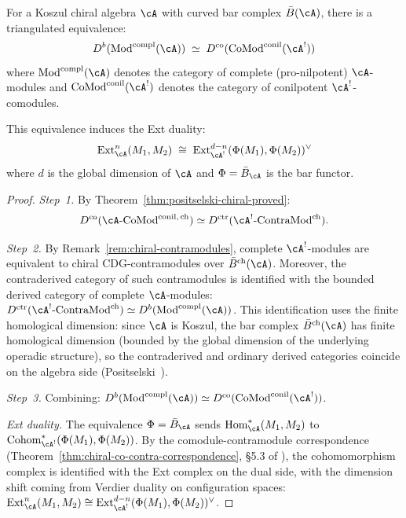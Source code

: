 \begin{theorem}
\label{thm:full-derived-module-equiv-proved}
For a Koszul chiral algebra $\cA$ with curved bar complex
$\bar{B}(\cA)$, there is a triangulated equivalence:
\begin{equation}\label{eq:full-derived-equiv-proved}
D^b(\mathrm{Mod}^{\mathrm{compl}}(\cA))
\;\simeq\;
D^{\mathrm{co}}(\mathrm{CoMod}^{\mathrm{conil}}(\cA^!))
\end{equation}
where $\mathrm{Mod}^{\mathrm{compl}}(\cA)$ denotes the category
of complete \textup{(}pro-nilpotent\textup{)} $\cA$-modules
and $\mathrm{CoMod}^{\mathrm{conil}}(\cA^!)$ denotes the
category of conilpotent $\cA^!$-comodules.

This equivalence induces the Ext duality:
\begin{equation}\label{eq:ext-duality-proved}
\mathrm{Ext}^n_{\cA}(M_1, M_2)
\;\cong\;
\mathrm{Ext}^{d-n}_{\cA^!}(\Phi(M_1), \Phi(M_2))^{\vee}
\end{equation}
where $d$ is the global dimension of $\cA$ and
$\Phi = \bar{B}_{\cA}$ is the bar functor.
\end{theorem}

\begin{proof}
\emph{Step~1.}
By Theorem~\ref{thm:positselski-chiral-proved}:
\[
D^{\mathrm{co}}(\cA\text{-}\mathrm{CoMod}^{\mathrm{conil,\,ch}})
\simeq
D^{\mathrm{ctr}}(\cA^!\text{-}\mathrm{ContraMod}^{\mathrm{ch}}).
\]

\emph{Step~2.}
By Remark~\ref{rem:chiral-contramodules}, complete $\cA^!$-modules
are equivalent to chiral CDG-contramodules over $\bar{B}^{\mathrm{ch}}(\cA)$.
Moreover, the contraderived category of such contramodules is
identified with the bounded derived category of complete
$\cA$-modules:
$D^{\mathrm{ctr}}(\cA^!\text{-}\mathrm{ContraMod}^{\mathrm{ch}})
\simeq D^b(\mathrm{Mod}^{\mathrm{compl}}(\cA))$.
This identification uses the finite homological dimension:
since $\cA$ is Koszul, the bar complex
$\bar{B}^{\mathrm{ch}}(\cA)$ has finite homological dimension
(bounded by the global dimension of the underlying operadic
structure), so the contraderived and ordinary derived categories
coincide on the algebra side
(Positselski~\cite[\S4.5]{Positselski11}).

\emph{Step~3.}
Combining: $D^b(\mathrm{Mod}^{\mathrm{compl}}(\cA)) \simeq
D^{\mathrm{co}}(\mathrm{CoMod}^{\mathrm{conil}}(\cA^!))$.

\emph{Ext duality.}
The equivalence $\Phi = \bar{B}_{\cA}$ sends
$\mathrm{Hom}^*_{\cA}(M_1, M_2)$ to
$\mathrm{Cohom}^*_{\cA^!}(\Phi(M_1), \Phi(M_2))$.
By the comodule-contramodule correspondence
(Theorem~\ref{thm:chiral-co-contra-correspondence}, \S5.3 of
\cite{Positselski11}), the cohomomorphism complex is identified
with the Ext complex on the dual side, with the dimension shift
coming from Verdier duality on configuration spaces:
$\mathrm{Ext}^n_{\cA}(M_1, M_2) \cong
\mathrm{Ext}^{d-n}_{\cA^!}(\Phi(M_1), \Phi(M_2))^{\vee}$.
\end{proof}

